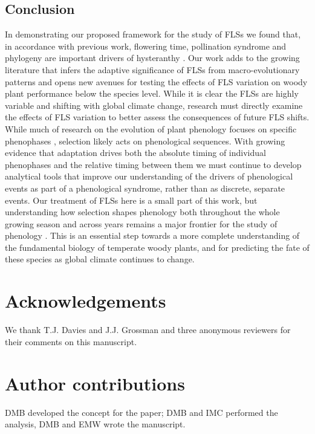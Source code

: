 \documentclass[11pt]{article}
\begin{document}
\subsection*{Conclusion}
\noindent In demonstrating our proposed framework for the study of FLSs we found that, in accordance with previous work, flowering time, pollination syndrome and phylogeny are important drivers of hysteranthy \citep{Gougherty2018}. Our work adds to the growing literature that infers the adaptive significance of FLSs from macro-evolutionary patterns and opens new avenues for testing the effects of FLS variation on woody plant performance below the species level. While it is clear the FLSs are highly variable and shifting with global climate change, research must directly examine the effects of FLS variation to better assess the consequences of future FLS shifts.\\

\noindent While much of research on the evolution of plant phenology focuses on specific phenophases \citep[e.g.][]{Savage2013,OLLERTON_1992}, selection likely acts on phenological sequences. With growing evidence that adaptation drives both the absolute timing of individual phenophases and the relative timing between them we must continue to develop analytical tools that improve our understanding of the drivers of phenological events as part of a phenological syndrome, rather than as discrete, separate events. 
Our treatment of FLSs here is a small part of this work, but understanding how selection shapes phenology both throughout the whole growing season and across years remains a major frontier for the study of phenology \citep{Wolkovich2014b}. This is an essential step towards a more complete understanding of the fundamental biology of temperate woody plants, and for predicting the fate of these species as global climate continues to change.


\section*{Acknowledgements}
\noindent We thank T.J. Davies and J.J. Grossman and three anonymous reviewers for their comments on this manuscript.

\section*{Author contributions}
DMB developed the concept for the paper; DMB and IMC performed the analysis, DMB and EMW wrote the manuscript.
\end{document}
